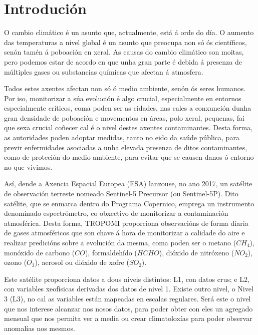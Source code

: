 \chapter{Introdución}\label{introducion}


O cambio climático é un asunto que, actualmente, está á orde do día. O aumento das temperaturas a nivel global é un asunto que preocupa non só ós
científicos, senón tamén á poboación en xeral. As causas do cambio climático son moitas, pero podemos estar de acordo en que unha gran parte é
debida á presenza de múltiples gases ou substancias químicas que afectan á atmosfera.

Todos estes axentes afectan non só ó medio ambiente, senón ós seres humanos. Por iso, monitorizar a súa evolución é algo crucial, especialmente en
entornos especialmente críticos, coma poden ser as cidades, nas cales a conxunción dunha gran densidade de poboación e movementos en áreas, polo xeral,
pequenas, fai que sexa crucial coñecer cal é o nivel destes axentes contaminantes. Desta forma, as autoridades poden adoptar medidas, tanto no eido
da saúde pública, para previr enfermidades asociadas a unha elevada presenza de ditos contaminantes, como de proteción do medio ambiente, para evitar
que se causen danos ó entorno no que vivimos.

Así, dende a Axencia Espacial Europea (ESA) lanzouse, no ano 2017, un satélite de observación terreste nomeado Sentinel-5 Precursor (ou Sentinel-5P).
Dito satélite, que se enmarca dentro do Programa Copernico, emprega un instrumento denominado espectrómetro, co obxectivo de monitorizar a contaminación
atmosférica. Desta forma, TROPOMI proporciona observacións de forma diaria de gases atmosféricos que son chave á hora de monitorizar a calidade do aire
e realizar predicións sobre a evolución da mesma, coma poden ser o metano ($CH_{4}$), monóxido de carbono ($CO$), formaldehído ($HCHO$), dióxido de nitróxeno
($NO_{2}$), ozono ($O_{3}$), aerosol ou dióxido de xofre ($SO_{2}$).

Este satélite proporciona datos a dous niveis distintos: L1, con datos crus; e L2, con variables xeofísicas derivadas dos datos de nivel 1. Existe outro nivel,
o Nivel 3 (L3), no cal as variables están mapeadas en escalas regulares. Será este o nivel que nos interese alcanzar nos nosos datos, para poder obter con eles
un agregado mensual que nos permita ver a media ou crear climatoloxías para poder observar anomalías nos mesmos.

